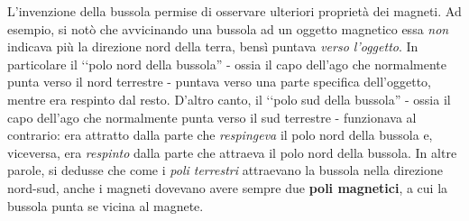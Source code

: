 L'invenzione della bussola permise di osservare ulteriori proprietà dei magneti. Ad esempio, si notò che avvicinando una bussola ad un oggetto magnetico essa \textit{non} indicava più la direzione nord della terra, bensì puntava \textit{verso l'oggetto}. In particolare il ‘‘polo nord della bussola'' - ossia il capo dell'ago che normalmente punta verso il nord terrestre - puntava verso una parte specifica dell'oggetto, mentre era respinto dal resto.
D'altro canto, il ‘‘polo sud della bussola'' - ossia il capo dell'ago che normalmente punta verso il sud terrestre  - funzionava al contrario: era attratto dalla parte che \textit{respingeva} il polo nord della bussola e, viceversa, era \textit{respinto} dalla parte che attraeva il polo nord della bussola.
In altre parole, si dedusse che come i \textit{poli terrestri} attraevano la bussola nella direzione nord-sud, anche i magneti dovevano avere sempre due \textbf{poli magnetici}, a cui la bussola punta se vicina al magnete.


